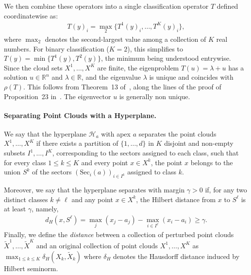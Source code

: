 \documentclass{article}
\renewcommand{\geq}{\geqslant}
\renewcommand{\leq}{\leqslant}
\newcommand{\R}{\mathbb{R}}
\begin{document}
We then combine these operators into a single classification operator $T$ defined coordinatewise as:
\begin{align}
  T(y)_i = \operatorname{\max}_2\{T^1(y)_i, \dots, T^K(y)_i\}\label{eq:single_operator},
\end{align}
where $\operatorname{\max}_2$ denotes the second-largest value among a collection of $K$ real numbers. For binary classification ($K=2$), this simplifies to $T(y)=\min\{T^1(y), T^2(y)\}$, the minimum being understood entrywise. Since
the cloud sets $X^1,\dots,X^K$ are finite, the eigenproblem
$T(u) =\lambda + u$ has a solution $u\in \R^n$ and $\lambda\in \R$,
and the eigenvalue $\lambda$ is unique and coincides with $\rho(T)$. This follows
from Theorem~13 of~\cite{gaubert2004}, along the lines of the proof of Proposition~23
in~\cite{akiangaubertqisaadi}. The eigenvector $u$ is generally non unique.



\paragraph{Separating Point Clouds with a Hyperplane.}

We say that the hyperplane $\mathcal{H}_a$ with apex $a$ separates the point clouds $X^1, \ldots, X^K$ if there exists a partition of $\{1,\dots,d\}$ in $K$ disjoint and non-empty subsets $I^1, \ldots, I^K$,
corresponding to the sectors assigned to each class, such that for every class $1 \leq k \leq K$ and every point $x \in X^k$, the point $x$ belongs to the union $S^k$ of the sectors $(\text{Sec}_i(a))_{i\in I^k}$ assigned to class $k$.

Moreover, we say that the hyperplane separates with margin $\gamma > 0$ if, for any two distinct classes $k \neq \ell$ and any point $x \in X^k$, the Hilbert distance from $x$ to $S^\ell$ is at least $\gamma$, namely,
\begin{align}
d_H(x, S^\ell) = \max_j(x_j - a_j) - \max_{i \in I^\ell}(x_i - a_i) \geq \gamma.
\end{align}
Finally, we define the {\em distance} between a collection of perturbed point clouds $\tilde{X}^1,\dots, \tilde{X}^K$ and an original collection of point clouds $X^1,\dots,X^K$ as $\max_{1\leq k\leq K} \delta_H(X_k,\tilde{X}_k)$ where $\delta_H$ denotes the Hausdorff distance induced by Hilbert seminorm.
\end{document}
